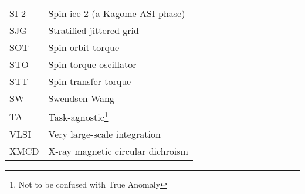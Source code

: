{\begin{longtable}[l]{ll}
        SI-2  & Spin ice 2 (a Kagome ASI phase)             \\
        SJG   & Stratified jittered grid                    \\
        SOT   & Spin-orbit torque                           \\
        STO   & Spin-torque oscillator                      \\
        STT   & Spin-transfer torque                        \\
        SW    & Swendsen-Wang                               \\ %
        TA    & Task-agnostic\footnote{Not to be confused with True Anomaly} \\
        VLSI  & Very large-scale integration                \\
        XMCD  & X-ray magnetic circular dichroism           \\
    \end{longtable}
}
